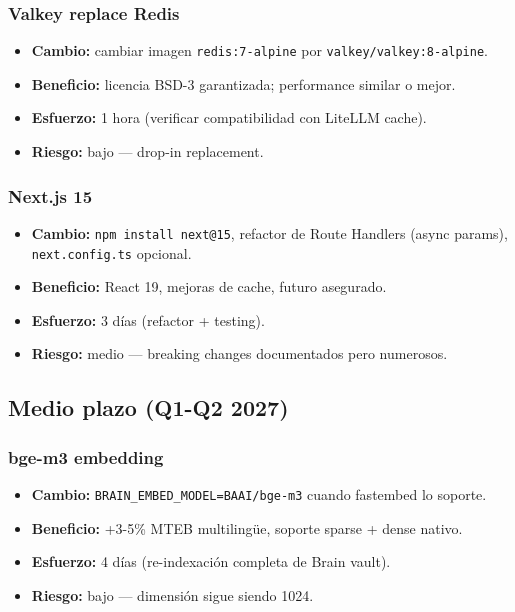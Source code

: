 \documentclass[11pt,a4paper]{article}
\begin{document}
\subsubsection{Valkey replace Redis}
\begin{itemize}[leftmargin=*,itemsep=1pt]
\item \textbf{Cambio:} cambiar imagen \texttt{redis:7-alpine} por \texttt{valkey/valkey:8-alpine}.
\item \textbf{Beneficio:} licencia BSD-3 garantizada; performance similar o mejor.
\item \textbf{Esfuerzo:} 1 hora (verificar compatibilidad con LiteLLM cache).
\item \textbf{Riesgo:} bajo — drop-in replacement.
\end{itemize}

\subsubsection{Next.js 15}
\begin{itemize}[leftmargin=*,itemsep=1pt]
\item \textbf{Cambio:} \texttt{npm install next@15}, refactor de Route Handlers (async params), \texttt{next.config.ts} opcional.
\item \textbf{Beneficio:} React 19, mejoras de cache, futuro asegurado.
\item \textbf{Esfuerzo:} 3 días (refactor + testing).
\item \textbf{Riesgo:} medio — breaking changes documentados pero numerosos.
\end{itemize}

\subsection{Medio plazo (Q1-Q2 2027)}

\subsubsection{bge-m3 embedding}
\begin{itemize}[leftmargin=*,itemsep=1pt]
\item \textbf{Cambio:} \texttt{BRAIN\_EMBED\_MODEL=BAAI/bge-m3} cuando fastembed lo soporte.
\item \textbf{Beneficio:} +3-5\% MTEB multilingüe, soporte sparse + dense nativo.
\item \textbf{Esfuerzo:} 4 días (re-indexación completa de Brain vault).
\item \textbf{Riesgo:} bajo — dimensión sigue siendo 1024.
\end{itemize}
\end{document}
